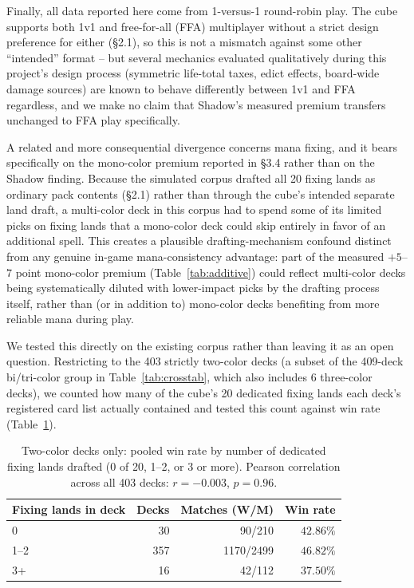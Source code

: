 \documentclass[11pt]{article}
\begin{document}
Finally, all data reported here come from 1-versus-1 round-robin play. The cube
supports both 1v1 and free-for-all (FFA) multiplayer without a strict design
preference for either (\S2.1), so this is not a mismatch against some other
``intended'' format -- but several mechanics evaluated qualitatively during this
project's design process (symmetric life-total taxes, edict effects, board-wide
damage sources) are known to behave differently between 1v1 and FFA regardless,
and we make no claim that Shadow's measured premium transfers unchanged to FFA
play specifically.

A related and more consequential divergence concerns mana fixing, and it bears
specifically on the mono-color premium reported in \S3.4 rather than on the
Shadow finding. Because the simulated corpus drafted all 20 fixing lands as
ordinary pack contents (\S2.1) rather than through the cube's intended separate
land draft, a multi-color deck in this corpus had to spend some of its limited
picks on fixing lands that a mono-color deck could skip entirely in favor of an
additional spell. This creates a plausible drafting-mechanism confound distinct
from any genuine in-game mana-consistency advantage: part of the measured
$+5$--$7$ point mono-color premium (Table~\ref{tab:additive}) could reflect
multi-color decks being systematically diluted with lower-impact picks by the
drafting process itself, rather than (or in addition to) mono-color decks
benefiting from more reliable mana during play.

We tested this directly on the existing corpus rather than leaving it as an open
question. Restricting to the 403 strictly two-color decks (a subset of the
409-deck bi/tri-color group in Table~\ref{tab:crosstab}, which also includes 6
three-color decks), we counted how many of the cube's 20 dedicated fixing lands
each deck's registered card list actually contained and tested this count against
win rate (Table~\ref{tab:fixingtiers}).

\begin{table}[h]
\centering
\caption{Two-color decks only: pooled win rate by number of dedicated fixing
lands drafted (0 of 20, 1--2, or 3 or more). Pearson correlation across all 403
decks: $r=-0.003$, $p=0.96$.}
\label{tab:fixingtiers}
\begin{tabular}{lrrr}
\toprule
Fixing lands in deck & Decks & Matches (W/M) & Win rate \\
\midrule
0  & 30  & 90/210    & $42.86\%$ \\
1--2 & 357 & 1170/2499 & $46.82\%$ \\
3+ & 16  & 42/112    & $37.50\%$ \\
\bottomrule
\end{tabular}
\end{table}
\end{document}
